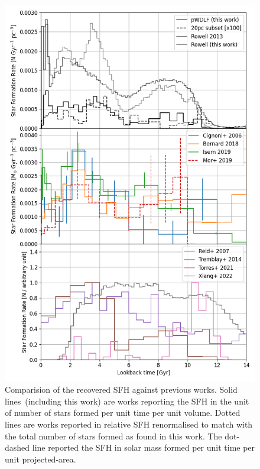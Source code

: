 \documentclass[fleqn,usenatbib]{mnras}
\begin{document}
\begin{figure}
  \includegraphics[width=\columnwidth]{figures/fig_08_compare_sfh.png}
  \caption{Comparision of the recovered SFH against previous works.
  Solid lines~(including this work)
  are works reporting the SFH in the unit of number of stars formed per
  unit time per unit volume. Dotted lines are works reported
  in relative SFH renormalised to match with the total number of stars formed
  as found in this work. The dot-dashed line reported the SFH in solar mass
  formed per unit time per unit projected-area.}
  \label{fig:comparison}
\end{figure}

\end{document}
